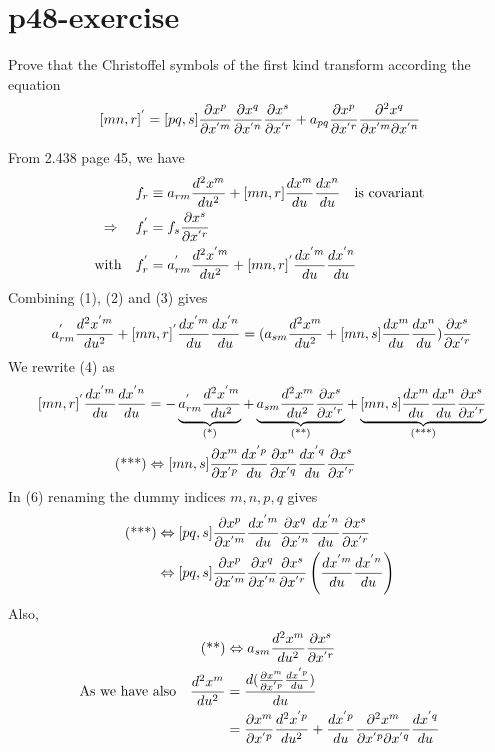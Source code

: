 \section{p48-exercise }
\begin{tcolorbox}
Prove that the Christoffel symbols of the first kind transform according the equation 
$$[mn,r]^{'} =  [pq,s]\pdv{x^p}{x^{'m}} \pdv{x^q}{x^{'n}}\pdv{x^s}{x^{'r}}+ a_{pq}\pdv{x^p}{x^{'r}}\pdv{x^q}{x^{'m}}{x^{'n}}$$
\end{tcolorbox}
From 2.438 page 45, we have
\begin{align}
\ f_r &\equiv a_{rm}\dv[2]{x^m}{u} +[mn,r]\dv{x^m}{u}\dv{x^n}{u} \quad\text{is covariant} \\
\Rightarrow\quad f_r^{'} &= f_s\pdv{x^s}{x^{'r}}\\
\text{with}\quad f_r^{'} &= a^{'}_{rm}\dv[2]{x^{'m}}{u} +[mn,r]^{'} \dv{x^{'m}}{u}\dv{x^{'n}}{u}
\end{align}
Combining (1), (2) and (3) gives 
\begin{align}
\ a^{'}_{rm}\dv[2]{x^{'m}}{u} +[mn,r]^{'} \dv{x^{'m}}{u}\dv{x^{'n}}{u} = ( a_{sm}\dv[2]{x^m}{u} +[mn,s]\dv{x^m}{u}\dv{x^n}{u})\pdv{x^s}{x^{'r}}
\end{align}
We rewrite (4) as 
\begin{align}
\ [mn,r]^{'} \dv{x^{'m}}{u}\dv{x^{'n}}{u} &= -\underbrace{a^{'}_{rm}\dv[2]{x^{'m}}{u}}_\text{(*)} +\underbrace{ a_{sm}\dv[2]{x^m}{u}\pdv{x^s}{x^{'r}}}_\text{(**)} +\underbrace{[mn,s]\dv{x^m}{u}\dv{x^n}{u}\pdv{x^s}{x^{'r}}}_\text{(***)}\\
\text{(***)} &\Leftrightarrow [mn,s]\pdv{x^m}{x^{'p}}\dv{x^{'p}}{u}\pdv{x^n}{x^{'q}}\dv{x^{'q}}{u}\pdv{x^s}{x^{'r}}
\end{align}
In (6) renaming the dummy indices $m,n,p,q$ gives
\begin{align}
\text{(***)} &\Leftrightarrow [pq,s]\pdv{x^p}{x^{'m}}\dv{x^{'m}}{u}\pdv{x^q}{x^{'n}}\dv{x^{'n}}{u}\pdv{x^s}{x^{'r}}\\
&\Leftrightarrow [pq,s]\pdv{x^p}{x^{'m}}\pdv{x^q}{x^{'n}}\pdv{x^s}{x^{'r}}\left(\dv{x^{'m}}{u}\dv{x^{'n}}{u}\right)
\end{align}
Also,
\begin{align}
\text{(**)} &\Leftrightarrow  a_{sm}\dv[2]{x^m}{u}\pdv{x^s}{x^{'r}}\\
\text{As we have also}\quad \dv[2]{x^m}{u} &= \dv{(\pdv{x^m}{x^{'p}}\dv{x^{'p}}{u})}{u}\\
&= \pdv{x^m}{x^{'p}}\dv[2]{x^{'p}}{u}+\dv{x^{'p}}{u}\pdv{x^m}{x^{'p}}{x^{'q}}\dv{x^{'q}}{u} 
\end{align}
